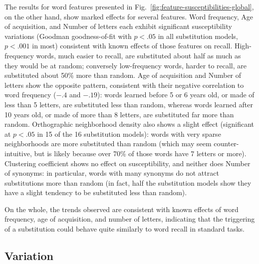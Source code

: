 \begin{new}

The results for word features presented in Fig.~\ref{fig:feature-susceptibilities-global}, on the other hand, show marked effects for several features.
Word frequency, Age of acquisition, and Number of letters each exhibit significant susceptibility variations (Goodman goodness-of-fit with $p < .05$ in all substitution models, $p < .001$ in most) consistent with known effects of those features on recall.
High-frequency words, much easier to recall, are substituted about half as much as they would be at random; conversely low-frequency words, harder to recall, are substituted about 50\% more than random.
Age of acquisition and Number of letters show the opposite pattern, consistent with their negative correlation to word frequency ($-.4$ and $-.19$):
words learned before 5 or 6 years old, or made of less than 5 letters, are substituted less than random, whereas words learned after 10 years old, or made of more than 8 letters, are substituted far more than random.
Orthographic neighborhood density also shows a slight effect (significant at $p < .05$ in 15 of the 16 substitution models):
words with very sparse neighborhoods are more substituted than random (which may seem counter-intuitive, but is likely because over 70\% of those words have 7 letters or more).
Clustering coefficient shows no effect on susceptibility, and neither does Number of synonyms:
in particular, words with many synonyms do not attract substitutions more than random (in fact, half the substitution models show they have a slight tendency to be substituted less than random).

On the whole, the trends observed are consistent with known effects of word frequency, age of acquisition, and number of letters, indicating that the triggering of a substitution could behave quite similarly to word recall in standard tasks.

\end{new}

\subsection{Variation}


